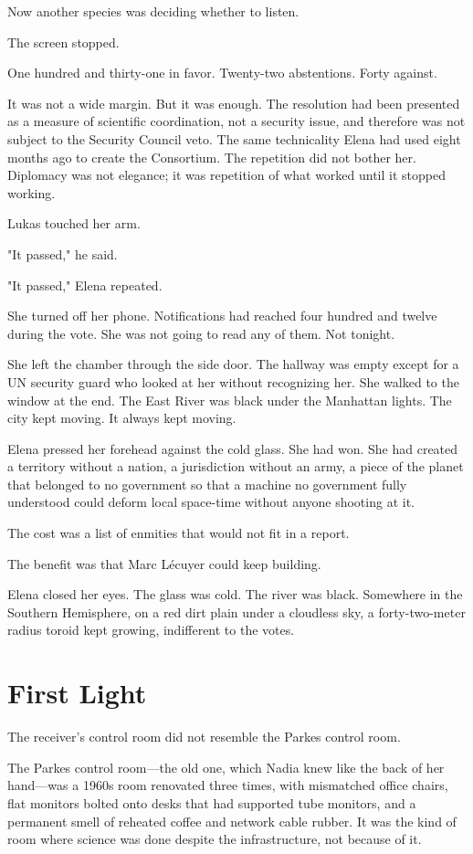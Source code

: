 \documentclass[11pt,a5paper,twoside]{book}
\begin{document}
Now another species was deciding whether to listen.

The screen stopped.

One hundred and thirty-one in favor. Twenty-two abstentions. Forty against.

It was not a wide margin. But it was enough. The resolution had been presented as a measure of scientific coordination, not a security issue, and therefore was not subject to the Security Council veto. The same technicality Elena had used eight months ago to create the Consortium. The repetition did not bother her. Diplomacy was not elegance; it was repetition of what worked until it stopped working.

Lukas touched her arm.

"It passed," he said.

"It passed," Elena repeated.

She turned off her phone. Notifications had reached four hundred and twelve during the vote. She was not going to read any of them. Not tonight.

She left the chamber through the side door. The hallway was empty except for a UN security guard who looked at her without recognizing her. She walked to the window at the end. The East River was black under the Manhattan lights. The city kept moving. It always kept moving.

Elena pressed her forehead against the cold glass. She had won. She had created a territory without a nation, a jurisdiction without an army, a piece of the planet that belonged to no government so that a machine no government fully understood could deform local space-time without anyone shooting at it.

The cost was a list of enmities that would not fit in a report.

The benefit was that Marc Lécuyer could keep building.

Elena closed her eyes. The glass was cold. The river was black. Somewhere in the Southern Hemisphere, on a red dirt plain under a cloudless sky, a forty-two-meter radius toroid kept growing, indifferent to the votes.

\chapter{First Light}

The receiver's control room did not resemble the Parkes control room.

The Parkes control room—the old one, which Nadia knew like the back of her hand—was a 1960s room renovated three times, with mismatched office chairs, flat monitors bolted onto desks that had supported tube monitors, and a permanent smell of reheated coffee and network cable rubber. It was the kind of room where science was done despite the infrastructure, not because of it.
\end{document}
